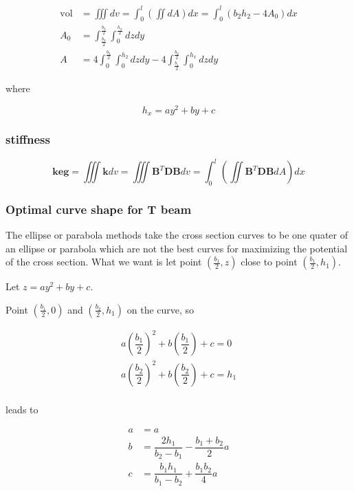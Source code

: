 \begin{align*}
\mathrm{vol} &= \iiint dv = \int _0^l \left( \iint dA \right) dx = \int _0^l \left( b_2 h_2 - 4 A_0 \right)dx \\
A_0 &= \int _\frac{b_1}{2}^\frac{b_2}{2}  \int _0^{\frac{h_x}{2}} dzdy \\
A &= 4 \int _0^\frac{b_2}{2}  \int _0^{h_2} dzdy - 4 \int _\frac{b_1}{2}^\frac{b_2}{2}  \int _0^{h_x} dzdy
\end{align*}

where

\begin{equation*}
h_x = a y^2 + b y + c
\end{equation*}

\subsubsection{stiffness}
\begin{equation*}
\mathbf{keg} = \iiint \mathbf{k} dv = \iiint \mathbf{B}^T \mathbf{D} \mathbf{B} dv = \int_0^l \left(  \iint \mathbf{B}^T \mathbf{D} \mathbf{B} dA\right)  dx
\end{equation*}

\subsubsection{Optimal curve shape for T beam}
The ellipse or parabola methods take the cross section curves to be one quater of an ellipse or parabola which are not the best curves for maximizing the potential of the cross section. What we want is let point $ \left( \frac{b_1}{2}, z\right) $ close to point $ \left(  \frac{b_1}{2}, h_1 \right) $.

Let $ z=a y^2 + b y + c $.

Point $ \left( \frac{b_1}{2}, 0\right) $ and $ \left( \frac{b_2}{2}, h_1\right) $ on the curve, so

\begin{align*}
a \left( \dfrac{b_1}{2} \right) ^2 + b \left(  \dfrac{b_1}{2}\right) + c = 0  \\
a \left( \dfrac{b_2}{2} \right) ^2 + b \left(  \dfrac{b_2}{2}\right) + c = h_1  \\
\end{align*}

leads to

\begin{align*}
a &= a \\
b &= \dfrac{2 h_1}{b_2-b_1} - \dfrac{b_1+b_2}{2} a \\
c &= \dfrac{b_1 h_1}{b_1 - b_2} + \dfrac{b_1 b_2}{4} a
\end{align*}

